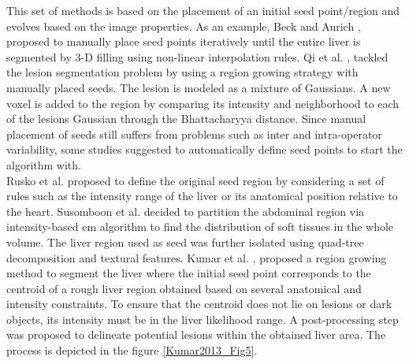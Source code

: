 This set of methods
is based on the placement of an initial seed point/region and evolves
based on the image properties. As an example, Beck and Aurich \cite{Beck2007}, proposed to manually place seed points iteratively
until the entire liver is segmented by 3-D filling using non-linear
interpolation rules.
Qi et al. \cite{Qi2008}, tackled the lesion segmentation problem by using a region
growing strategy with manually placed seeds. The lesion is modeled as a
mixture of Gaussians. A new voxel is added to the region by comparing its
intensity and neighborhood to each of the lesions Gaussian through the
Bhattacharyya distance.
Since manual placement of seeds still suffers from problems
such as inter and intra-operator variability, some studies suggested to
automatically define seed points to start the algorithm with.\\
Rusko et al. \cite{Rusko2007, Rusko2009}
proposed to define the original seed region by considering a set of rules
such as the intensity range of the liver or its
anatomical position relative to the heart.
Susomboon et al. \cite{Susomboon2007} decided to partition the abdominal region via intensity-based
\ac{em} algorithm to find the distribution of soft tissues in the whole
volume. The liver region used as seed was further isolated using
quad-tree decomposition and textural features.
Kumar et al. \cite{Kumar2013}, proposed a region growing method to segment the liver where the
initial seed point corresponds to the centroid of a rough liver region
obtained based on several anatomical and intensity constraints. To
ensure that the centroid does not lie on lesions or dark objects, its
intensity must be in the liver likelihood range. A post-processing step was 
proposed to delineate potential lesions within the obtained liver area. The process is depicted
in the figure \ref{Kumar2013_Fig5}.

